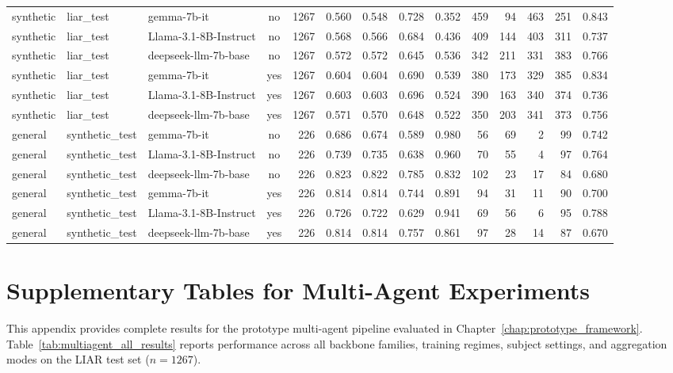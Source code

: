 \begin{landscape}
\begin{longtable}{@{}l l p{3.6cm} c r r r r r r r r r r@{}}
synthetic  & liar\_test      & gemma-7b-it           & no  & 1267 & 0.560 & 0.548 & 0.728 & 0.352 & 459 &  94 & 463 & 251 & 0.843 \\
synthetic  & liar\_test      & Llama-3.1-8B-Instruct & no  & 1267 & 0.568 & 0.566 & 0.684 & 0.436 & 409 & 144 & 403 & 311 & 0.737 \\
synthetic  & liar\_test      & deepseek-llm-7b-base  & no  & 1267 & 0.572 & 0.572 & 0.645 & 0.536 & 342 & 211 & 331 & 383 & 0.766 \\
synthetic  & liar\_test      & gemma-7b-it           & yes & 1267 & 0.604 & 0.604 & 0.690 & 0.539 & 380 & 173 & 329 & 385 & 0.834 \\
synthetic  & liar\_test      & Llama-3.1-8B-Instruct & yes & 1267 & 0.603 & 0.603 & 0.696 & 0.524 & 390 & 163 & 340 & 374 & 0.736 \\
synthetic  & liar\_test      & deepseek-llm-7b-base  & yes & 1267 & 0.571 & 0.570 & 0.648 & 0.522 & 350 & 203 & 341 & 373 & 0.756 \\
general    & synthetic\_test & gemma-7b-it           & no  &  226 & 0.686 & 0.674 & 0.589 & 0.980 &  56 &  69 &   2 &  99 & 0.742 \\
general    & synthetic\_test & Llama-3.1-8B-Instruct & no  &  226 & 0.739 & 0.735 & 0.638 & 0.960 &  70 &  55 &   4 &  97 & 0.764 \\
general    & synthetic\_test & deepseek-llm-7b-base  & no  &  226 & 0.823 & 0.822 & 0.785 & 0.832 & 102 &  23 &  17 &  84 & 0.680 \\
general    & synthetic\_test & gemma-7b-it           & yes &  226 & 0.814 & 0.814 & 0.744 & 0.891 &  94 &  31 &  11 &  90 & 0.700 \\
general    & synthetic\_test & Llama-3.1-8B-Instruct & yes &  226 & 0.726 & 0.722 & 0.629 & 0.941 &  69 &  56 &   6 &  95 & 0.788 \\
general    & synthetic\_test & deepseek-llm-7b-base  & yes &  226 & 0.814 & 0.814 & 0.757 & 0.861 &  97 &  28 &  14 &  87 & 0.670 \\

\end{longtable}
\end{landscape}


\chapter{Supplementary Tables for Multi-Agent Experiments}

This appendix provides complete results for the prototype multi-agent pipeline evaluated in Chapter~\ref{chap:prototype_framework}. Table~\ref{tab:multiagent_all_results} reports performance across all backbone families, training regimes, subject settings, and aggregation 
modes on the LIAR test set ($n=1267$).

